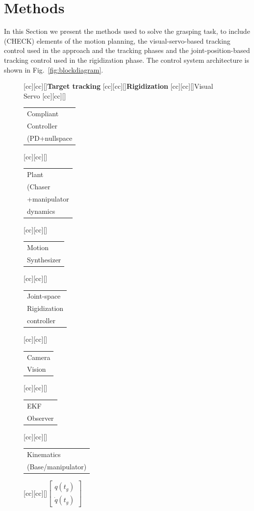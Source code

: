 \section{Methods}
\label{sec:methods}
%
In this Section we present the methods used to solve the grasping task, to include (CHECK) elements of the motion planning, the visual-servo-based tracking control used in the approach and the tracking phases and the joint-position-based tracking control used in the rigidization phase. The control system architecture is shown in Fig.~\ref{fig:blockdiagram}.
%
\begin{figure}
[cc][cc][\FontFigS]{\textbf{Target tracking}}
[cc][cc][\FontFigS]{\textbf{Rigidization}}
[cc][cc][\FontFigS]{Visual Servo}
[cc][cc][\FontFigS]{\small{\begin{tabular}{@{}l@{}} Compliant\\Controller\\(PD+nullspace\end{tabular}}}
[cc][cc][\FontFigS]{\small{\begin{tabular}{@{}l@{}} Plant\\(Chaser\\+manipulator\\dynamics\end{tabular}}}
[cc][cc][\FontFigS]{{\begin{tabular}{@{}l@{}} Motion\\Synthesizer \end{tabular}}}
[cc][cc][\FontFigS]{\small{\begin{tabular}{@{}l@{}} Joint-space\\Rigidization\\controller \end{tabular}}}
[cc][cc][\FontFigS]{\small{\begin{tabular}{@{}l@{}} Camera\\Vision \end{tabular}}}
[cc][cc][\FontFigS]{\small{\begin{tabular}{@{}l@{}} EKF\\Observer \end{tabular}}}
[cc][cc][\FontFigS]{\small{\begin{tabular}{@{}l@{}} Kinematics\\(Base/manipulator) \end{tabular}}}
[cc][cc][\FontFigS]{\small{$\begin{bmatrix}q(t_g)\\ \dot{q}(t_g)\end{bmatrix}$}}

\end{figure}
